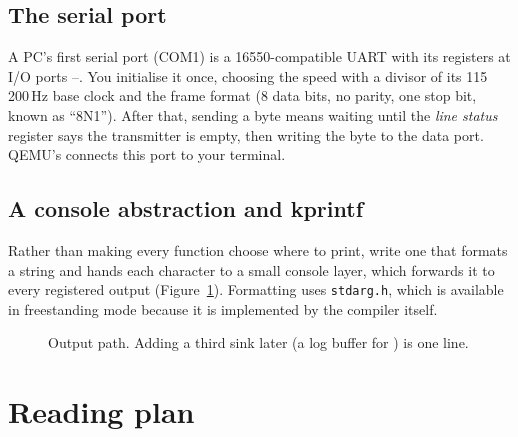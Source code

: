 \documentclass[11pt,a4paper]{article}
\begin{document}
\subsection{The serial port}

A PC's first serial port (COM1) is a 16550-compatible UART with its registers at I/O ports --.
You initialise it once, choosing the speed with a divisor of its 115\,200\,Hz base clock and the frame format
(8 data bits, no parity, one stop bit, known as ``8N1''). After that, sending a byte means waiting until the
\emph{line status} register says the transmitter is empty, then writing the byte to the data port. QEMU's
 connects this port to your terminal.

\subsection{A console abstraction and kprintf}

Rather than making every function choose where to print, write one  that formats a string and hands
each character to a small console layer, which forwards it to every registered output (Figure~\ref{fig:console}).
Formatting uses \texttt{stdarg.h}, which is available in freestanding mode because it is implemented by the compiler
itself.

\begin{figure}[htbp]
\centering
{}
\caption{Output path. Adding a third sink later (a log buffer for ) is one line.}
\label{fig:console}
\end{figure}

\section{Reading plan}
\end{document}
